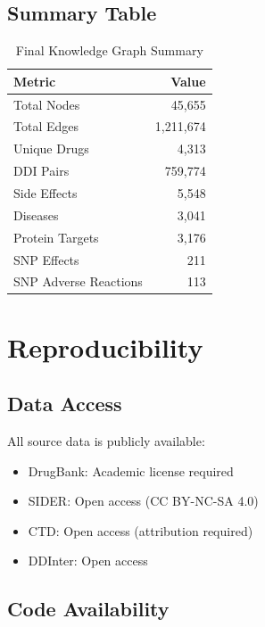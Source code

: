 \documentclass[11pt,a4paper]{article}
\begin{document}
\subsection{Summary Table}

\begin{table}[h]
\centering
\caption{Final Knowledge Graph Summary}
\label{tab:final_stats}
\begin{tabular}{@{}lr@{}}
\toprule
\textbf{Metric} & \textbf{Value} \\
\midrule
Total Nodes & 45,655 \\
Total Edges & 1,211,674 \\
Unique Drugs & 4,313 \\
DDI Pairs & 759,774 \\
Side Effects & 5,548 \\
Diseases & 3,041 \\
Protein Targets & 3,176 \\
SNP Effects & 211 \\
SNP Adverse Reactions & 113 \\
\bottomrule
\end{tabular}
\end{table}

\section{Reproducibility}

\subsection{Data Access}

All source data is publicly available:

\begin{itemize}
    \item DrugBank: Academic license required
    \item SIDER: Open access (CC BY-NC-SA 4.0)
    \item CTD: Open access (attribution required)
    \item DDInter: Open access
\end{itemize}

\subsection{Code Availability}
\end{document}
